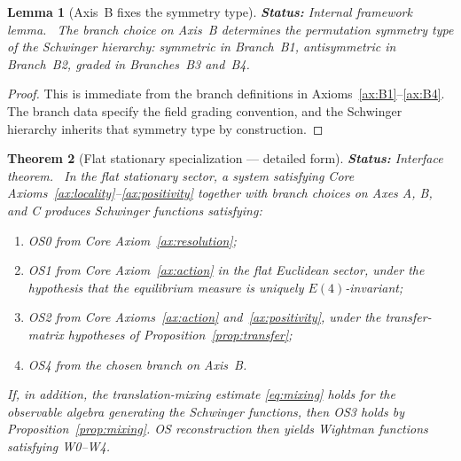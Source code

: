 \documentclass[12pt,a4paper]{article}
\theoremstyle{plain}
\newtheorem{theorem}{Theorem}[section]
\newtheorem{lemma}[theorem]{Lemma}
\theoremstyle{definition}
\theoremstyle{remark}
\newcommand{\status}[1]{\textnormal{\textbf{Status:} #1.}\ }
\begin{document}
\begin{lemma}[Axis~B fixes the symmetry type]
  \label{lem:axis-b-symmetry}
  \status{Internal framework lemma}
  The branch choice on Axis~B determines the permutation symmetry type
  of the Schwinger hierarchy: symmetric in Branch~B1, antisymmetric in
  Branch~B2, graded in Branches~B3 and~B4.
\end{lemma}
\begin{proof}
  This is immediate from the branch definitions in
  Axioms~\ref{ax:B1}--\ref{ax:B4}. The branch data specify the field
  grading convention, and the Schwinger hierarchy inherits that
  symmetry type by construction.
\end{proof}

\begin{theorem}[Flat stationary specialization --- detailed form]
  \label{thm:flat-detail}
  \status{Interface theorem}
  In the flat stationary sector, a system satisfying Core
  Axioms~\ref{ax:locality}--\ref{ax:positivity} together with branch
  choices on Axes A, B, and C produces Schwinger functions satisfying:
  \begin{enumerate}[nosep,label=(\roman*)]
  \item OS0 from Core Axiom~\ref{ax:resolution};
  \item OS1 from Core Axiom~\ref{ax:action} in the flat Euclidean
    sector, under the hypothesis that the equilibrium measure is
    uniquely $E(4)$-invariant;
  \item OS2 from Core Axioms~\ref{ax:action} and~\ref{ax:positivity},
    under the transfer-matrix hypotheses of
    Proposition~\ref{prop:transfer};
  \item OS4 from the chosen branch on Axis~B.
  \end{enumerate}
  If, in addition, the translation-mixing estimate
  \eqref{eq:mixing} holds for the observable algebra generating the
  Schwinger functions, then OS3 holds by
  Proposition~\ref{prop:mixing}. OS reconstruction then yields
  Wightman functions satisfying W0--W4.
\end{theorem}
\end{document}

